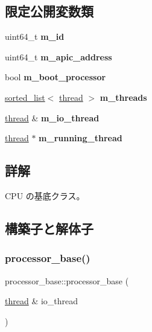 \subsection*{限定公開変数類}
\begin{DoxyCompactItemize}
\item 
\hypertarget{classprocessor__base_ab445b3c1354265a31d97603fb40e0797}{}\label{classprocessor__base_ab445b3c1354265a31d97603fb40e0797} 
uint64\+\_\+t {\bfseries m\+\_\+id}
\item 
\hypertarget{classprocessor__base_a96a89dc7297e7c28c0548b786ce52c71}{}\label{classprocessor__base_a96a89dc7297e7c28c0548b786ce52c71} 
uint64\+\_\+t {\bfseries m\+\_\+apic\+\_\+address}
\item 
\hypertarget{classprocessor__base_a4d4563c5da59f6d620b22978dd7dcf78}{}\label{classprocessor__base_a4d4563c5da59f6d620b22978dd7dcf78} 
bool {\bfseries m\+\_\+boot\+\_\+processor}
\item 
\hypertarget{classprocessor__base_a43e64f45f8cac6046cf1231e64509eca}{}\label{classprocessor__base_a43e64f45f8cac6046cf1231e64509eca} 
\hyperlink{classsorted__list}{sorted\+\_\+list}$<$ \hyperlink{classthread}{thread} $>$ {\bfseries m\+\_\+threads}
\item 
\hypertarget{classprocessor__base_a029809d46de2f1f24ca8c4fcdb2b549b}{}\label{classprocessor__base_a029809d46de2f1f24ca8c4fcdb2b549b} 
\hyperlink{classthread}{thread} \& {\bfseries m\+\_\+io\+\_\+thread}
\item 
\hypertarget{classprocessor__base_af117224c5de5f3ff2db614c88708ae8b}{}\label{classprocessor__base_af117224c5de5f3ff2db614c88708ae8b} 
\hyperlink{classthread}{thread} $\ast$ {\bfseries m\+\_\+running\+\_\+thread}
\end{DoxyCompactItemize}


\subsection{詳解}
C\+PU の基底クラス。 

\subsection{構築子と解体子}
\hypertarget{classprocessor__base_a0fb3660589090640decbaef29e66a100}{}\label{classprocessor__base_a0fb3660589090640decbaef29e66a100} 
\subsubsection{\texorpdfstring{processor\+\_\+base()}{processor\_base()}\hspace{0.1cm}{\footnotesize\ttfamily [1/3]}}
{\footnotesize\ttfamily processor\+\_\+base\+::processor\+\_\+base (\begin{DoxyParamCaption}\item[{\hyperlink{classthread}{thread} \&}]{io\+\_\+thread }\end{DoxyParamCaption})}

